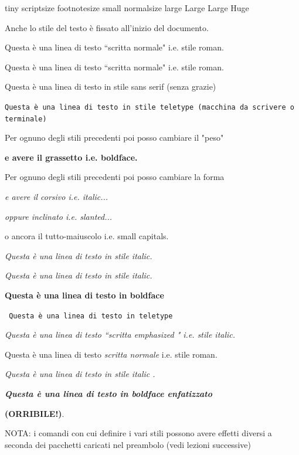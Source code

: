 \documentclass[12pt]{article}
\begin{document}
{\tiny   tiny}
{\scriptsize  scriptsize}
{\footnotesize   footnotesize}
{\small   small }
{\normalsize  normalsize} 
{\large  large}
{\Large  Large}
{\LARGE Large}
{\Huge Huge}

\bigskip\bigskip\bigskip
Anche lo stile del testo \`e fissato all'inizio del documento.
\bigskip

Questa \`e una linea di testo ``scritta normale" i.e. stile roman.

{\rm Questa \`e una linea di testo ``scritta normale" i.e. stile roman.}

{\sf Questa \`e una linea di testo in stile sans serif (senza grazie)}

{\tt Questa \`e una linea di testo in stile teletype (macchina da scrivere o terminale)}


\medskip %
Per ognuno degli stili { precedenti} poi posso cambiare il "peso" 

{\bf  e avere il grassetto  i.e. boldface.}

\medskip %
Per ognuno degli stili precedenti poi posso cambiare la forma 

{\it e avere il corsivo i.e. italic... } 

{\sl oppure inclinato i.e. slanted...} 

{\sc o ancora il tutto-maiuscolo i.e. small capitals}.

\medskip %


{\it Questa \`e una linea di testo in stile italic.}

\textit{ Questa \`e una linea di testo in stile italic.}

\textbf{ Questa \`e una linea di testo in boldface}

\texttt{ Questa \`e una linea di testo in teletype}



{\em Questa \`e una linea di testo ``scritta emphasized " i.e. stile italic.}

\bigskip

Questa \`e una linea di testo {\em scritta normale} i.e. stile roman. 
 
{\it Questa \`e una linea di testo {\em  in stile italic} .}

\bigskip


{\bf \em Questa \`e una linea di testo in boldface enfatizzato}

{\huge \bf (ORRIBILE!)}.

\bigskip
NOTA: i comandi con cui definire i vari stili possono avere effetti diversi a seconda dei pacchetti caricati nel preambolo (vedi lezioni successive)
\newpage
\end{document}
